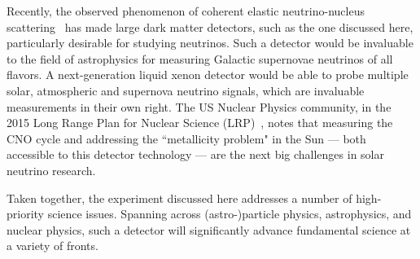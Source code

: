 Recently, the observed phenomenon of coherent elastic neutrino-nucleus scattering~\cite{Akimov:2017ade} has made large dark matter detectors, such as the one discussed here, particularly desirable for studying neutrinos. Such a detector would be invaluable to the field of astrophysics for measuring Galactic supernovae neutrinos of all flavors. A next-generation liquid xenon detector would be able to probe multiple solar, atmospheric and supernova neutrino signals, which are invaluable measurements in their own right. The US Nuclear Physics community, in the 2015 Long Range Plan for Nuclear Science (LRP)~\cite{LRP:2015}, notes that measuring the CNO cycle and addressing the ``metallicity problem" in the Sun --- both accessible to this detector technology --- are the next big challenges in solar neutrino research.

Taken together, the experiment discussed here addresses a number of high-priority science issues. Spanning across (astro-)particle physics, astrophysics, and nuclear physics, such a detector will significantly advance fundamental science at a variety of fronts.
